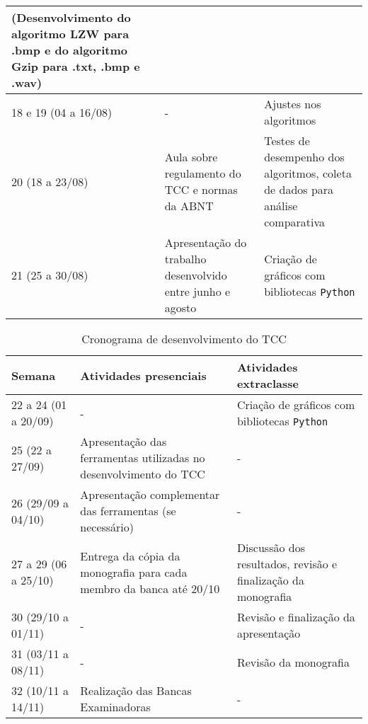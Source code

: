 \begin{table}[htb]
\begin{tabular}{|p{4cm}|p{5cm}|p{5cm}|}
        (Desenvolvimento do algoritmo LZW para .bmp e do algoritmo Gzip para .txt, .bmp e .wav)\\
        \hline
        18 e 19 (04 a 16/08) & - & Ajustes nos algoritmos \\
        \hline
        20 (18 a 23/08) & Aula sobre regulamento do TCC e normas da ABNT & Testes de desempenho dos algoritmos, coleta de dados para análise comparativa\\
        \hline
        21 (25 a 30/08) & Apresentação do trabalho desenvolvido entre junho e agosto & Criação de gráficos com bibliotecas \texttt{Python} \\
        \hline
    \end{tabular}
    \label{tab:cronograma}
\end{table}

\begin{table}[htb]
    \centering
    \renewcommand{\arraystretch}{1.3}
    \begin{tabular}{|p{4cm}|p{5cm}|p{5cm}|}
	\hline
        \textbf{Semana} & \textbf{Atividades presenciais} & \textbf{Atividades extraclasse} \\
        \hline
        22 a 24 (01 a 20/09) & - & Criação de gráficos com bibliotecas \texttt{Python} \\
        \hline
        25 (22 a 27/09) & Apresentação das ferramentas utilizadas no desenvolvimento do TCC & - \\
        \hline
        26 (29/09 a 04/10) & Apresentação complementar das ferramentas (se necessário) & - \\
        \hline
        27 a 29 (06 a 25/10) & Entrega da cópia da monografia para cada membro da banca até 20/10 & Discussão dos resultados, revisão e finalização da monografia \\
        \hline
        30 (29/10 a 01/11) & - & Revisão e finalização da apresentação \\
        \hline
        31 (03/11 a 08/11) & - & Revisão da monografia \\
        \hline
        32 (10/11 a 14/11) & Realização das Bancas Examinadoras & - \\
        \hline
    \end{tabular}
    \caption{Cronograma de desenvolvimento do TCC}
\end{table}
